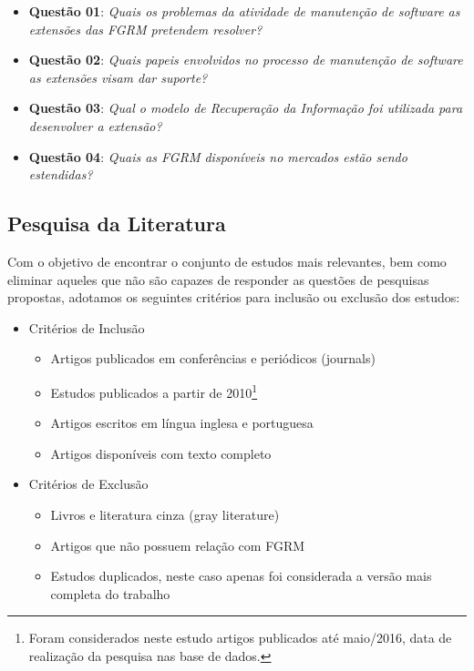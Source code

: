 

\begin{itemize}
	\item \textbf{Questão 01}: \textit{Quais os problemas da atividade de manutenção de software as extensões das FGRM pretendem resolver?}
	\item \textbf{Questão 02}: \textit{Quais papeis envolvidos no processo de manutenção de software as extensões visam dar suporte?}
	\item \textbf{Questão 03}: \textit{Qual o modelo de Recuperação da Informação foi utilizada para desenvolver a extensão?}
	\item \textbf{Questão 04}: \textit{Quais as FGRM disponíveis no mercados estão sendo estendidas?}

\end{itemize}

\subsection{Pesquisa da Literatura}
\label{subsec:map-pesquisa-literatura}

Com o objetivo de encontrar o conjunto de estudos mais relevantes, bem como eliminar aqueles que não são capazes de responder as questões de pesquisas propostas, adotamos os seguintes critérios para inclusão ou exclusão dos estudos:

\begin{itemize}
	\item Critérios de Inclusão
		\begin{itemize}
			 \item Artigos publicados em conferências e periódicos (journals)
			 \item Estudos publicados a partir de 2010\footnote{Foram considerados neste estudo artigos publicados até maio/2016, data de realização da pesquisa nas base de dados.}
			 \item Artigos escritos em língua inglesa e portuguesa
			 \item Artigos disponíveis com texto completo
		\end{itemize}
	\item Critérios de Exclusão
		\begin{itemize}
			\item Livros e literatura cinza (gray literature)
			\item Artigos que não possuem relação com FGRM
			\item Estudos duplicados, neste caso apenas foi considerada a versão mais completa do trabalho
		\end{itemize}
\end{itemize}

